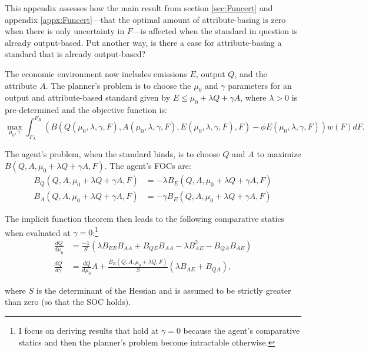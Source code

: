 \documentclass[12pt]{article}
\begin{document}
This appendix assesses how the main result from section \ref{sec:Funcert} and appendix \ref{appx:Funcert}---that the optimal amount of attribute-basing is zero when there is only uncertainty in $F$---is affected when the standard in question is already output-based. Put another way, is there a case for attribute-basing a standard that is already output-based?

The economic environment now includes emissions $E$, output $Q$, and the attribute $A$. The planner's problem is to choose the $\mu_0$ and $\gamma$ parameters for an output and attribute-based standard given by $E\leq \mu_0+\lambda Q + \gamma A$, where $\lambda>0$ is pre-determined and the objective function is:
\begin{equation}
\max_{\mu_0,\gamma} \int_{F_L}^{F_H}\left(B(Q(\mu_0,\lambda,\gamma,F),A(\mu_0,\lambda,\gamma,F),E(\mu_0,\lambda,\gamma,F),F)-\phi E(\mu_0,\lambda,\gamma,F)\right)w(F)dF. \label{eq:A6_RegProbFuncert}
\end{equation}

The agent's problem, when the standard binds, is to choose $Q$ and $A$ to maximize $B(Q,A,\mu_0+\lambda Q + \gamma A,F)$. The agent's FOCs are:
\begin{align}
B_Q(Q,A,\mu_0+\lambda Q + \gamma A,F) &= -\lambda B_E(Q,A,\mu_0+\lambda Q + \gamma A,F) \label{eq:A6_FOCQ} \\
B_A(Q,A,\mu_0+\lambda Q + \gamma A,F) &= -\gamma B_E(Q,A,\mu_0+\lambda Q + \gamma A,F) \label{eq:A6_FOCA}
\end{align}

The implicit function theorem then leads to the following comparative statics when evaluated at $\gamma=0$:\footnote{I focus on deriving results that hold at $\gamma=0$ because the agent's comparative statics and then the planner's problem become intractable otherwise.}
\begin{align}
\frac{dQ}{d\mu_0} &= \frac{-1}{S}\left(\lambda B_{EE}B_{AA} + B_{QE}B_{AA} - \lambda B_{AE}^2 - B_{QA}B_{AE}\right) \label{eq:A6_dQdmu} \\
\frac{dQ}{d\gamma} &= \frac{dQ}{d\mu_0}A + \frac{B_E(Q,A,\mu_0+\lambda Q,F)}{S}\left(\lambda B_{AE} + B_{QA}\right), \label{eq:A6_dQdgamma}
\end{align}

\noindent where $S$ is the determinant of the Hessian and is assumed to be strictly greater than zero (so that the SOC holds).
\end{document}
